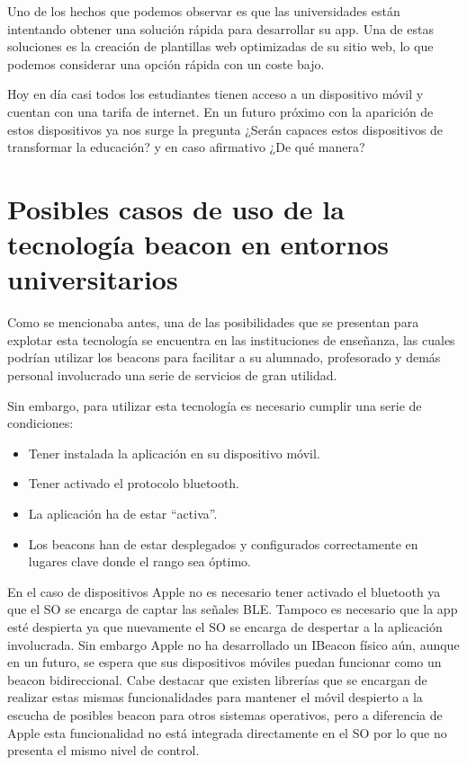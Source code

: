 Uno de los hechos que podemos observar es que las universidades están intentando obtener una solución rápida para desarrollar su app. Una de estas soluciones es la creación de plantillas web optimizadas de su sitio web, lo que podemos considerar una opción rápida con un coste bajo.


Hoy en día casi todos los estudiantes tienen acceso a un dispositivo móvil y cuentan con una tarifa de internet. En un futuro próximo con la aparición de estos dispositivos ya nos surge la pregunta ¿Serán capaces estos dispositivos de transformar la educación? y en caso afirmativo ¿De qué manera? 

\section {Posibles casos de uso de la tecnología beacon en entornos universitarios}

Como se mencionaba antes, una de las posibilidades que se presentan para explotar esta tecnología se encuentra en las instituciones de enseñanza, las cuales podrían utilizar los beacons para facilitar a su alumnado, profesorado y demás personal involucrado  una serie de servicios de gran utilidad.


Sin embargo, para utilizar esta tecnología es necesario cumplir una serie de condiciones:

\begin{itemize}
\item Tener instalada la aplicación en su dispositivo móvil.
\item Tener activado el protocolo bluetooth.
\item La aplicación ha de estar "`activa"'.
\item Los beacons han de estar desplegados y configurados correctamente en lugares clave donde el rango sea óptimo.
\end{itemize}

En el caso de dispositivos Apple no es necesario tener activado el bluetooth ya que el SO se encarga de captar las señales BLE. Tampoco es necesario que la app esté despierta ya que nuevamente el SO se encarga de despertar a la aplicación involucrada. Sin embargo Apple no ha desarrollado un IBeacon físico aún, aunque en un futuro, se espera que sus dispositivos móviles puedan funcionar como un beacon bidireccional. Cabe destacar que existen librerías que se encargan de realizar estas mismas funcionalidades para mantener el móvil despierto a la escucha de posibles beacon para otros sistemas operativos, pero a diferencia de Apple esta funcionalidad no está integrada directamente en el SO por lo que no presenta el mismo nivel de control.


